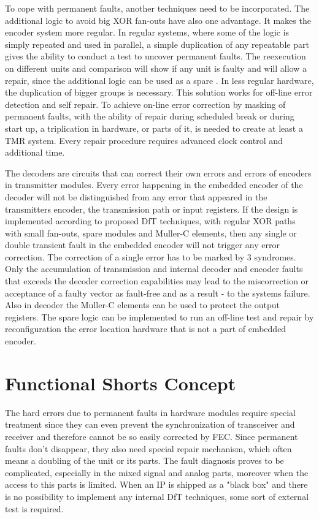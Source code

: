 To cope with permanent faults, another techniques need to be incorporated. The additional logic to avoid big XOR fan-outs have also one advantage. It makes the encoder system more regular. In regular systems, where some of the logic is simply repeated and used in parallel, a simple duplication of any repeatable part gives the ability to conduct a test to uncover permanent faults. The reexecution on different units and comparison will show if any unit is faulty and will allow a repair, since the additional logic can be used as a spare \cite{art:Dicorato}. In less regular hardware, the duplication of bigger groups is necessary. This solution works for off-line error detection and self repair. To achieve on-line error correction by masking of permanent faults, with the ability of repair during scheduled break or during start up, a triplication in hardware, or parts of it, is needed to create at least a TMR system. Every repair procedure requires advanced clock control and additional time.

The decoders are circuits that can correct their own errors and errors of encoders in transmitter modules. Every error happening in the embedded encoder of the decoder will not be distinguished from any error that appeared in the transmitters encoder, the transmission path or input registers. If the design is implemented according to proposed DfT techniques, with regular XOR paths with small fan-outs, spare modules and Muller-C elements, then any single or double transient fault in the embedded encoder will not trigger any error correction. The correction of a single error has to be marked by 3 syndromes. Only the accumulation of transmission and internal decoder and encoder faults that exceeds the decoder correction capabilities may lead to the miscorrection or acceptance of a faulty vector as fault-free and as a result - to the systems failure. Also in decoder the Muller-C elements can be used to protect the output registers. The spare logic can be implemented to run an off-line test and repair by reconfiguration the error location hardware that is not a part of embedded encoder\cite{art:Dicorato}.

\section{Functional Shorts Concept}\label{sec:shorts}
The hard errors due to permanent faults in hardware modules require special treatment since they can even prevent the synchronization of transceiver and receiver and therefore cannot be so easily corrected by FEC. Since permanent faults don't disappear, they also need special repair mechanism, which often means a doubling of the unit or its parts. The fault diagnosis proves to be complicated, especially in the mixed signal and analog parts, moreover when the access to this parts is limited. When an IP is shipped as a "black box" and there is no possibility to implement any internal DfT techniques, some sort of external test is required. 

